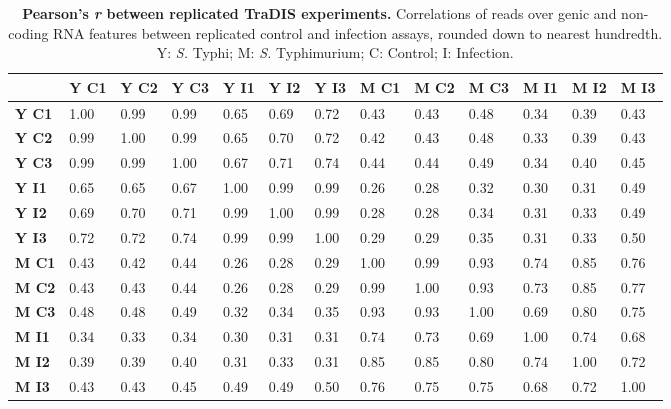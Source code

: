 %
\begin{table}
   \tiny
   \centering
   \noindent
    \caption[Pearson's {\it r} between replicated TraDIS experiments]{\textbf{Pearson's \textit{r} between replicated TraDIS experiments.} Correlations of reads over genic and non-coding RNA features between replicated control and infection assays, rounded down to nearest hundredth. Y: \textit{S.} Typhi; M: \textit{S.} Typhimurium; C: Control; I: Infection. }
    \begin{tabular}{ l
    				l
				l
				l
				l
				l
				l
				l
				l
				l
				l
				l
				l
				}
   
    \\
     \toprule
    &\textbf{Y C1} & \textbf{Y C2} & \textbf{Y C3} & \textbf{Y I1} & \textbf{Y I2} & \textbf{Y I3} &  \textbf{M C1}&  \textbf{M C2} &  \textbf{M C3} &  \textbf{M I1}&  \textbf{M I2}&  \textbf{M I3}\\
    \midrule
\textbf{Y C1} &   1.00 & 0.99 & 0.99 & 0.65 & 0.69 & 0.72 & 0.43 & 0.43 & 0.48 & 0.34 & 0.39 & 0.43\\
\textbf{Y C2} &  0.99 & 1.00 & 0.99 & 0.65 & 0.70 & 0.72 & 0.42 & 0.43 & 0.48 & 0.33 & 0.39 & 0.43\\
 \textbf{Y C3} & 0.99 & 0.99 & 1.00 & 0.67 & 0.71 & 0.74 & 0.44 & 0.44 & 0.49 & 0.34 & 0.40 & 0.45\\
 \textbf{Y I1} & 0.65 & 0.65 & 0.67 & 1.00 & 0.99 & 0.99 & 0.26 & 0.28 & 0.32 & 0.30 & 0.31 & 0.49\\
\textbf{Y I2} &  0.69 & 0.70 & 0.71 & 0.99 & 1.00 & 0.99 & 0.28 & 0.28 & 0.34 & 0.31 & 0.33 & 0.49\\
  \textbf{Y I3} & 0.72 & 0.72 & 0.74 & 0.99 & 0.99 & 1.00 & 0.29 & 0.29 & 0.35 & 0.31 & 0.33 & 0.50\\
 \textbf{M C1}&  0.43 & 0.42 & 0.44 & 0.26 & 0.28 & 0.29 & 1.00 & 0.99 & 0.93 & 0.74 & 0.85 & 0.76\\
\textbf{M C2}&  0.43 & 0.43 & 0.44 & 0.26 & 0.28 & 0.29 & 0.99 & 1.00 & 0.93 & 0.73 & 0.85 & 0.77\\
 \textbf{M C3} &  0.48 & 0.48 & 0.49 & 0.32 & 0.34 & 0.35 & 0.93 & 0.93 & 1.00 & 0.69 & 0.80 & 0.75\\
 \textbf{M I1} & 0.34 & 0.33 & 0.34 & 0.30 & 0.31 & 0.31 & 0.74 & 0.73 & 0.69 & 1.00 & 0.74 & 0.68\\
  \textbf{M I2} & 0.39 & 0.39 & 0.40 & 0.31 & 0.33 & 0.31 & 0.85 & 0.85 & 0.80 & 0.74 & 1.00 & 0.72\\
 \textbf{M I3} &  0.43 & 0.43 & 0.45 & 0.49 & 0.49 & 0.50 & 0.76 & 0.75 & 0.75 & 0.68 & 0.72 & 1.00\\
    \bottomrule
    \end{tabular}%
    \label{tab:pear}%
\end{table}


